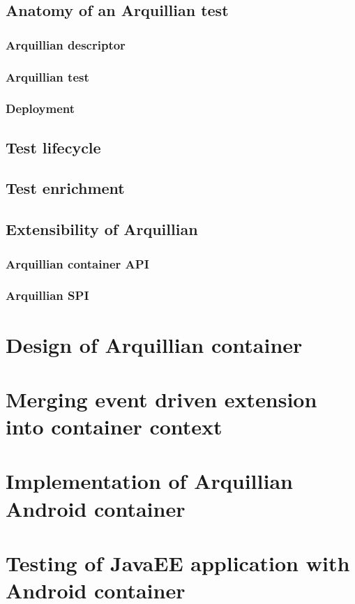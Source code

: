 \documentclass[12pt,final,oneside]{fithesis}
\begin{document}
	\section{Anatomy of an Arquillian test}
		\subsection{Arquillian descriptor}
		\subsection{Arquillian test}
		\subsection{Deployment}
	\section{Test lifecycle}
	\section{Test enrichment}
	\section{Extensibility of Arquillian}
		\subsection{Arquillian container API}
		\subsection{Arquillian SPI}
	
\chapter{Design of Arquillian container}
	\chapter{Merging event driven extension into container context}
	
\chapter{Implementation of Arquillian Android container}

\chapter{Testing of JavaEE application with Android container}
\end{document}
